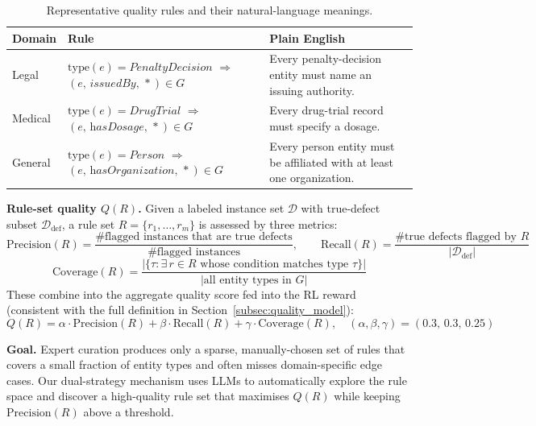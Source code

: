 \documentclass[runningheads]{llncs}
\begin{document}
\begin{table}[H]
\centering
\caption{Representative quality rules and their natural-language meanings.}
\label{tab:rule_examples}
\begin{tabular}{p{1.8cm} p{3.8cm} p{5.5cm}}
\toprule
\textbf{Domain} & \textbf{Rule} & \textbf{Plain English} \\
\midrule
Legal &
$\mathrm{type}(e){=}\textit{PenaltyDecision}$ $\Rightarrow$ $(e,\,\textit{issuedBy},\,{*}){\in}G$ &
Every penalty-decision entity must name an issuing authority. \\
\addlinespace
Medical &
$\mathrm{type}(e){=}\textit{DrugTrial}$ $\Rightarrow$ $(e,\,\textit{hasDosage},\,{*}){\in}G$ &
Every drug-trial record must specify a dosage. \\
\addlinespace
General &
$\mathrm{type}(e){=}\textit{Person}$ $\Rightarrow$ $(e,\,\textit{hasOrganization},\,{*}){\in}G$ &
Every person entity must be affiliated with at least one organization. \\
\bottomrule
\end{tabular}
\end{table}

\textbf{Rule-set quality $Q(R)$.}
Given a labeled instance set $\mathcal{D}$ with true-defect subset $\mathcal{D}_{\mathrm{def}}$,
a rule set $R = \{r_1,\ldots,r_m\}$ is assessed by three metrics:
\begin{equation}
    \mathrm{Precision}(R) = \frac{\text{\# flagged instances that are true defects}}{\text{\# flagged instances}},\qquad
    \mathrm{Recall}(R) = \frac{\text{\# true defects flagged by }R}{|\mathcal{D}_{\mathrm{def}}|}
    \label{eq:rule_pr}
\end{equation}
\begin{equation}
    \mathrm{Coverage}(R) = \frac{|\{\tau : \exists\,r\in R \text{ whose condition matches type }\tau\}|}{|\text{all entity types in }G|}
    \label{eq:rule_coverage}
\end{equation}
These combine into the aggregate quality score fed into the RL reward (consistent with the full definition in Section~\ref{subsec:quality_model}):
\begin{equation}
    Q(R) = \alpha\cdot\mathrm{Precision}(R) + \beta\cdot\mathrm{Recall}(R) + \gamma\cdot\mathrm{Coverage}(R),
    \quad (\alpha,\beta,\gamma)=(0.3,\,0.3,\,0.25)
    \label{eq:qr}
\end{equation}

\textbf{Goal.} Expert curation produces only a sparse, manually-chosen set of rules that covers a
small fraction of entity types and often misses domain-specific edge cases.
Our dual-strategy mechanism uses LLMs to automatically explore the rule space
and discover a high-quality rule set that maximises $Q(R)$ while keeping $\mathrm{Precision}(R)$ above a threshold.
\end{document}

